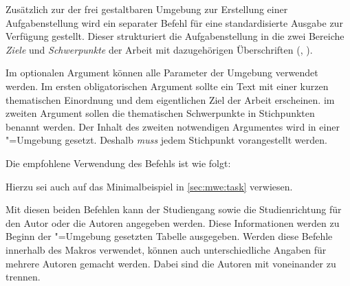 \documentclass[%
  english,ngerman,%
  headings=optiontoheadandtoc,captions=tableheading,numbers=noenddot,%
  chapterpage,cdfoot,%
]{tudscrman}
\begin{document}
\begin{Declaration}{\LParameter%
}
\printdeclarationlist%
Zusätzlich zur der frei gestaltbaren Umgebung  zur Erstellung
einer Aufgabenstellung wird ein separater Befehl für eine standardisierte 
Ausgabe zur Verfügung gestellt. Dieser strukturiert die Aufgabenstellung in die 
zwei Bereiche \emph{Ziele} und \emph{Schwerpunkte} der Arbeit mit dazugehörigen 
Überschriften (, ).

Im optionalen Argument können alle Parameter der Umgebung  
verwendet werden. Im ersten obligatorischen Argument sollte ein Text mit einer 
kurzen thematischen Einordnung und dem eigentlichen Ziel der Arbeit erscheinen. 
im zweiten Argument sollen die thematischen Schwerpunkte in Stichpunkten benannt 
werden. Der Inhalt des zweiten notwendigen Argumentes wird in einer 
"=Umgebung gesetzt. Deshalb \emph{muss} jedem Stichpunkt 
 vorangestellt werden.
%
\end{Declaration}
%
\begin{Example}
Die empfohlene Verwendung des Befehls  ist wie folgt:
\begin{code}[escapechar=§]
\end{code}
Hierzu sei auch auf das Minimalbeispiel in \autoref{sec:mwe:task} verwiesen.
\end{Example}

\begin{Declaration}{}
\begin{Declaration}{}
\printdeclarationlist%
%
Mit diesen beiden Befehlen kann der Studiengang sowie die Studienrichtung für 
den Autor oder die Autoren angegeben werden. Diese Informationen werden zu 
Beginn der "=Umgebung gesetzten Tabelle ausgegeben. Werden 
diese Befehle innerhalb des Makros  verwendet, können auch 
unterschiedliche Angaben für mehrere Autoren gemacht werden. Dabei sind die 
Autoren mit  voneinander zu trennen.
\end{Declaration}
\end{Declaration}
\end{document}
